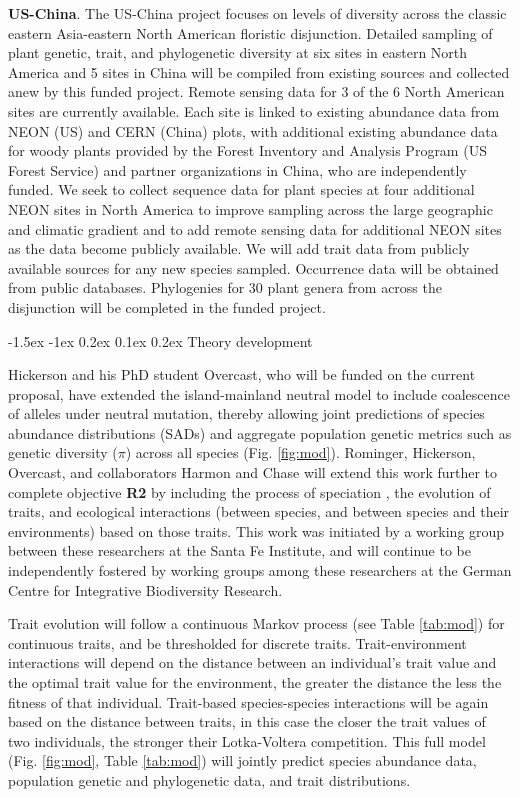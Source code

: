 \documentclass[11pt]{article}
\makeatletter
\renewcommand\subsubsection{\@startsection{subsection}{1}{\z@}%
                                  {-1.5ex \@plus -1ex \@minus 0.2ex}%
                                  {0.1ex \@plus 0.2ex}%
                                  {\normalfont\bfseries}}
\makeatother
\begin{document}
\textbf{US-China}. The US-China project focuses on levels of diversity
across the classic eastern Asia-eastern North American floristic
disjunction. Detailed sampling of plant genetic, trait, and
phylogenetic diversity at six sites in eastern North America and 5
sites in China will be compiled from existing sources and collected
anew by this funded project. Remote sensing data for 3 of the 6 North
American sites are currently available. Each site is linked to
existing abundance data from NEON (US) and CERN (China) plots, with
additional existing abundance data for woody plants provided by the
Forest Inventory and Analysis Program (US Forest Service) and partner
organizations in China, who are independently funded. We seek to
collect sequence data for plant species at four additional NEON sites
in North America to improve sampling across the large geographic and
climatic gradient and to add remote sensing data for additional NEON
sites as the data become publicly available. We will add trait data
from publicly available sources for any new species
sampled. Occurrence data will be obtained from public
databases. Phylogenies for 30 plant genera from across the disjunction
will be completed in the funded project.


\subsubsection{Theory development}\label{theory-development}

Hickerson and his PhD student Overcast, who will be funded on the
current proposal, have extended the island-mainland neutral model
\cite{Rosindell2013-di} to include coalescence of alleles under
neutral mutation, thereby allowing joint predictions of species
abundance distributions (SADs) and aggregate population genetic
metrics such as genetic diversity ($\pi$) across all species
(Fig. \ref{fig:mod}). Rominger, Hickerson, Overcast, and collaborators
Harmon and Chase will extend this work further to complete objective
\textbf{R2} by including the process of speciation
\cite{Rosindell2010-gq}, the evolution of traits, and ecological
interactions (between species, and between species and their
environments) based on those traits. This work was initiated by a
working group between these researchers at the Santa Fe Institute, and
will continue to be independently fostered by working groups among
these researchers at the German Centre for Integrative Biodiversity
Research.

Trait evolution will follow a continuous Markov process (see Table
\ref{tab:mod}) for continuous traits, and be thresholded
\cite{Felsenstein2012-aj} for discrete traits. Trait-environment
interactions will depend on the distance between an individual's trait
value and the optimal trait value for the environment, the greater the
distance the less the fitness of that individual. Trait-based
species-species interactions will be again based on the distance
between traits, in this case the closer the trait values of two
individuals, the stronger their Lotka-Voltera \cite{Wilson2003-kp}
competition. This full model (Fig. \ref{fig:mod}, Table \ref{tab:mod})
will jointly predict species abundance data, population genetic and
phylogenetic data, and trait distributions.
\end{document}
